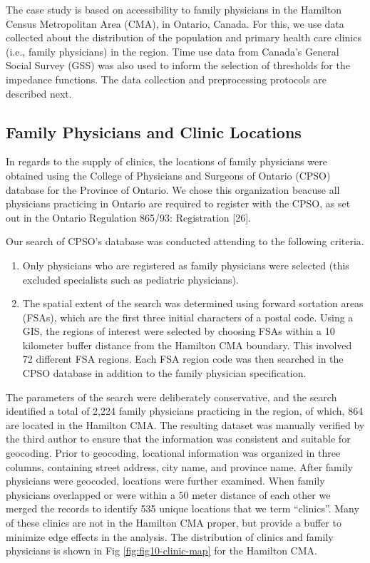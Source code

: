 \documentclass[10pt,letterpaper]{article}
\begin{document}
The case study is based on accessibility to family physicians in the
Hamilton Census Metropolitan Area (CMA), in Ontario, Canada. For this,
we use data collected about the distribution of the population and
primary health care clinics (i.e., family physicians) in the region.
Time use data from Canada's General Social Survey (GSS) was also used to
inform the selection of thresholds for the impedance functions. The data
collection and preprocessing protocols are described next.

\subsection{Family Physicians and Clinic
Locations}\label{family-physicians-and-clinic-locations}

In regards to the supply of clinics, the locations of family physicians
were obtained using the College of Physicians and Surgeons of Ontario
(CPSO) database for the Province of Ontario. We chose this organization
beacuse all physicians practicing in Ontario are required to register
with the CPSO, as set out in the Ontario Regulation 865/93: Registration
{[}26{]}.

Our search of CPSO's database was conducted attending to the following
criteria.

\begin{enumerate}
\def\labelenumi{\arabic{enumi})}
\item
  Only physicians who are registered as family physicians were selected
  (this excluded specialists such as pediatric physicians).
\item
  The spatial extent of the search was determined using forward
  sortation areas (FSAs), which are the first three initial characters
  of a postal code. Using a GIS, the regions of interest were selected
  by choosing FSAs within a 10 kilometer buffer distance from the
  Hamilton CMA boundary. This involved 72 different FSA regions. Each
  FSA region code was then searched in the CPSO database in addition to
  the family physician specification.
\end{enumerate}

The parameters of the search were deliberately conservative, and the
search identified a total of 2,224 family physicians practicing in the
region, of which, 864 are located in the Hamilton CMA. The resulting
dataset was manually verified by the third author to ensure that the
information was consistent and suitable for geocoding. Prior to
geocoding, locational information was organized in three columns,
containing street address, city name, and province name. After family
physicians were geocoded, locations were further examined. When family
physicians overlapped or were within a 50 meter distance of each other
we merged the records to identify 535 unique locations that we term
``clinics''. Many of these clinics are not in the Hamilton CMA proper,
but provide a buffer to minimize edge effects in the analysis. The
distribution of clinics and family physicians is shown in Fig
\ref{fig:fig10-clinic-map} for the Hamilton CMA.
\end{document}
